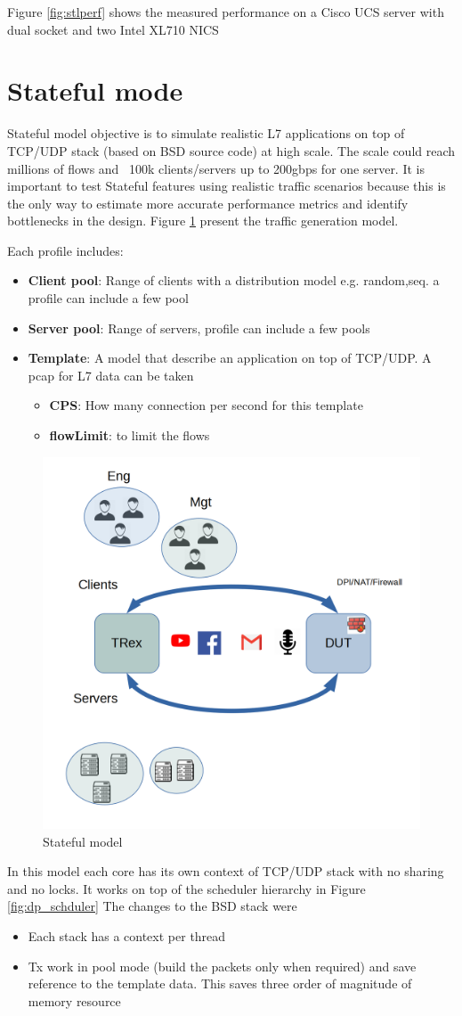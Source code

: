 \documentclass[conference]{IEEEtran}
\begin{document}
Figure \ref{fig:stlperf} \cite{b5} shows the measured performance on a Cisco UCS server with dual socket and two Intel XL710 NICS 

\section{Stateful mode} 

Stateful model objective is to simulate realistic L7 applications on top of TCP/UDP stack (based on BSD source code) at high scale.
The scale could reach millions of flows and ~100k clients/servers up to 200gbps for one server. 
It is important to test Stateful features using realistic traffic scenarios because this is the only way to estimate more accurate performance metrics and identify bottlenecks in the design. 
Figure \ref{fig:astf} present the traffic generation model. 

Each profile includes:
\begin{itemize}
  \item \textbf{Client pool}: Range of clients with a distribution model e.g. random,seq. a profile can include a few pool
  \item \textbf{Server pool}: Range of servers, profile can include a few pools 
  \item \textbf{Template}: A model that describe an application on top of TCP/UDP. A pcap for L7 data can be taken 
  \begin{itemize}
  \item \textbf{CPS}: How many connection per second for this template 
  \item \textbf{flowLimit}: to limit the flows 
  \end{itemize}
\end{itemize}

\begin{figure}[h]
  \includegraphics[width=0.3
  \textwidth, center]{stateful_model.png}
  \caption{Stateful model}
  \label{fig:astf}
\end{figure}

In this model each core has its own context of TCP/UDP stack with no sharing and no locks. It works on top of the scheduler hierarchy in Figure \ref{fig:dp_schduler}
The changes to the BSD stack were
\begin{itemize}
  \item Each stack has a context per thread 
  \item Tx work in pool mode (build the packets only when required) and save reference to the template data. This saves three order of magnitude of memory resource 
\end{itemize}
\end{document}
